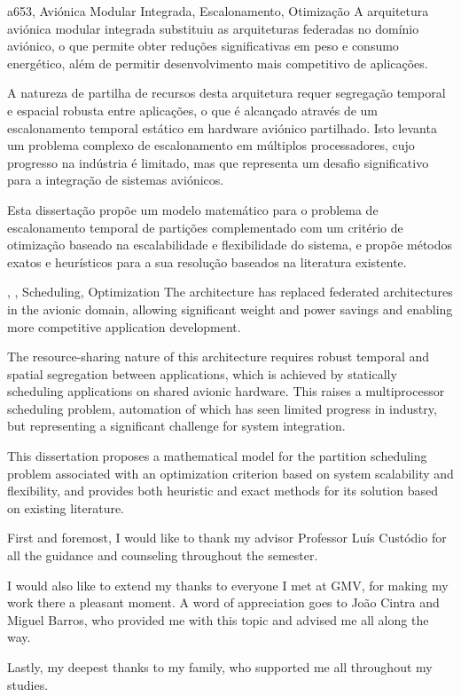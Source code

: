 \documentclass[english]{ist-thesis}
\begin{document}
\makecover

\begin{fabstract}{\gls{a653}, Aviónica Modular Integrada, Escalonamento, Otimização}
    A arquitetura aviónica modular integrada substituiu as arquiteturas federadas no domínio aviónico, o que permite obter reduções significativas em peso e consumo energético, além de permitir desenvolvimento mais competitivo de aplicações.

    A natureza de partilha de recursos desta arquitetura requer segregação temporal e espacial robusta entre aplicações, o que é alcançado através de um escalonamento temporal estático em hardware aviónico partilhado.
    Isto levanta um problema complexo de escalonamento em múltiplos processadores, cujo progresso na indústria é limitado, mas que representa um desafio significativo para a integração de sistemas aviónicos.

    Esta dissertação propõe um modelo matemático para o problema de escalonamento temporal de partições complementado com um critério de otimização baseado na escalabilidade e flexibilidade do sistema, e propõe métodos exatos e heurísticos para a sua resolução baseados na literatura existente.
\end{fabstract}

\begin{tabstract}{, , Scheduling, Optimization}
    The  architecture has replaced federated architectures in the avionic domain, allowing significant weight and power savings and enabling more competitive application development.
    
    The resource-sharing nature of this architecture requires robust temporal and spatial segregation between applications, which is achieved by statically scheduling applications on shared avionic hardware.
    This raises a multiprocessor scheduling problem, automation of which has seen limited progress in industry, but representing a significant challenge for system integration.
    
    This dissertation proposes a mathematical model for the partition scheduling problem associated with an optimization criterion based on system scalability and flexibility, and provides both heuristic and exact methods for its solution based on existing literature.
\end{tabstract}

\begin{acknowledgements}
    First and foremost, I would like to thank my advisor Professor Luís Custódio for all the guidance and counseling throughout the semester.

    I would also like to extend my thanks to everyone I met at GMV, for making my work there a pleasant moment.
    A word of appreciation goes to João Cintra and Miguel Barros, who provided me with this topic and advised me all along the way.

    Lastly, my deepest thanks to my family, who supported me all throughout my studies.

\end{acknowledgements}
\end{document}
